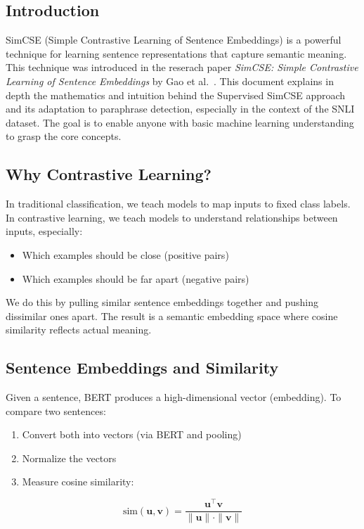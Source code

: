 \subsection{Introduction}
SimCSE (Simple Contrastive Learning of Sentence Embeddings) is a powerful technique for learning sentence representations that capture semantic meaning. This technique was introduced in the reserach paper \textit{SimCSE: Simple Contrastive Learning of Sentence Embeddings} by Gao et al.~\cite{gao2021simcse}. This document explains in depth the mathematics and intuition behind the Supervised SimCSE approach and its adaptation to paraphrase detection, especially in the context of the SNLI dataset. The goal is to enable anyone with basic machine learning understanding to grasp the core concepts.

\subsection{Why Contrastive Learning?}

In traditional classification, we teach models to map inputs to fixed class labels. In contrastive learning, we teach models to understand relationships between inputs, especially:
\begin{itemize}
    \item Which examples should be close (positive pairs)
    \item Which examples should be far apart (negative pairs)
\end{itemize}

We do this by pulling similar sentence embeddings together and pushing dissimilar ones apart. The result is a semantic embedding space where cosine similarity reflects actual meaning.

\subsection{Sentence Embeddings and Similarity}

Given a sentence, BERT produces a high-dimensional vector (embedding). To compare two sentences:
\begin{enumerate}
    \item Convert both into vectors (via BERT and pooling)
    \item Normalize the vectors
    \item Measure cosine similarity:
\end{enumerate}

\[
\text{sim}(\mathbf{u}, \mathbf{v}) = \frac{\mathbf{u}^\top \mathbf{v}}{\|\mathbf{u}\| \cdot \|\mathbf{v}\|}
\]

